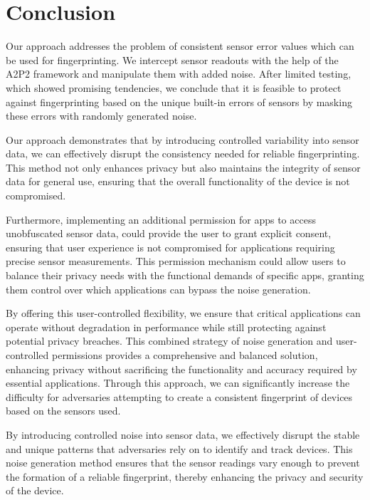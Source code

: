 \documentclass[11pt,
  oneside,openany,    %
]{scrreprt}
\begin{document}
\chapter{Conclusion}
\label{chap:conclusion}
Our approach addresses the problem of consistent sensor error values which can be used for fingerprinting.
We intercept sensor readouts with the help of the A2P2 framework and manipulate them with added noise.
After limited testing, which showed promising tendencies, we conclude that it is feasible to protect against fingerprinting based on the unique built-in errors of sensors by masking these errors with randomly generated noise.

Our approach demonstrates that by introducing controlled variability into sensor data, we can effectively disrupt the consistency needed for reliable fingerprinting. 
This method not only enhances privacy but also maintains the integrity of sensor data for general use, ensuring that the overall functionality of the device is not compromised.

Furthermore, implementing an additional permission for apps to access unobfuscated sensor data, could provide the user to grant explicit consent, ensuring that user experience is not compromised for applications requiring precise sensor measurements.
This permission mechanism could allow users to balance their privacy needs with the functional demands of specific apps, granting them control over which applications can bypass the noise generation.

By offering this user-controlled flexibility, we ensure that critical applications can operate without degradation in performance while still protecting against potential privacy breaches.
This combined strategy of noise generation and user-controlled permissions provides a comprehensive and balanced solution, enhancing privacy without sacrificing the functionality and accuracy required by essential applications. 
Through this approach, we can significantly increase the difficulty for adversaries attempting to create a consistent fingerprint of devices based on the sensors used. 

By introducing controlled noise into sensor data, we effectively disrupt the stable and unique patterns that adversaries rely on to identify and track devices. 
This noise generation method ensures that the sensor readings vary enough to prevent the formation of a reliable fingerprint, thereby enhancing the privacy and security of the device.

\end{document}
